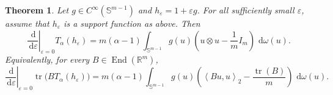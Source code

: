 \documentclass[11pt,a4paper]{amsart}
\numberwithin{equation}{section}
\theoremstyle{plain}
\newtheorem{theorem}{Theorem}[section]
\theoremstyle{definition}
\theoremstyle{remark}
\DeclareMathOperator{\End}{End}
\DeclareMathOperator{\tr}{tr}
\newcommand{\R}{\mathbb{R}}
\newcommand{\dd}{\,\mathrm{d}}
\newcommand{\Id}{I}
\newcommand{\sphere}{\mathbb{S}}
\newcommand{\ip}[2]{\left\langle #1,#2\right\rangle_2}
\begin{document}
\begin{theorem}\label{thm:first-variation}
Let $g\in C^\infty(\sphere^{m-1})$ and $h_\varepsilon=1+\varepsilon g$. For all sufficiently small $\varepsilon$, assume that $h_\varepsilon$ is a support function as above. Then
\begin{equation}\label{eq:first-variation-operator}
\left.\frac{\dd}{\dd\varepsilon}\right|_{\varepsilon=0}T_\alpha(h_\varepsilon)
=m(\alpha-1)\int_{\sphere^{m-1}}g(u)
\left(u\otimes u-\frac1m\Id_m\right)\,\dd\omega(u).
\end{equation}
Equivalently, for every $B\in\End(\R^m)$,
\begin{equation}\label{eq:first-variation-paired}
\left.\frac{\dd}{\dd\varepsilon}\right|_{\varepsilon=0}
\tr\big(BT_\alpha(h_\varepsilon)\big)
=m(\alpha-1)\int_{\sphere^{m-1}}g(u)
\left(\ip{Bu}{u}-\frac{\tr(B)}m\right)\,\dd\omega(u).
\end{equation}
\end{theorem}
\end{document}
